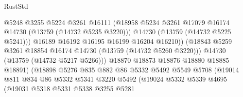 \begin{lexlean}{RustStd}
\begin{coremodule}
                                      @5248
                                      @3255
                                      @5224
                                      @3261
                                      @16111
                                      (@18958
                                        @5234
                                        @3261
                                        @17079
                                        @16174
                                        @14730
                                        (@13759 (@14732 @5235 @3220)))
                                      @14730
                                      (@13759 (@14732 @5225 @5241)))
                                    @16189
                                    @16192
                                    @16195
                                    @16199
                                    @16204
                                    @16210))
                                (@18843
                                  @5259
                                  @3261
                                  @18854
                                  @16174
                                  @14730
                                  (@13759 (@14732 @5260 @3220)))
                                @14730
                                (@13759 (@14732 @5217 @5266)))
                              @18870
                              @18873
                              @18876
                              @18880
                              @18885
                              @18891)
                            (@18898
                              @5276
                              @835
                              @882
                              @86
                              @5332
                              @5492
                              @5549
                              @5708
                              (@19014
                                @811
                                @834
                                @86
                                @5332
                                @5341
                                @3220
                                @5492
                                (@19024
                                  @5332
                                  @5339
                                  @4695
                                  (@19031
                                    @5318
                                    @5331
                                    @5338
                                    @3255
                                    @5281

\end{coremodule}
\end{lexlean}
